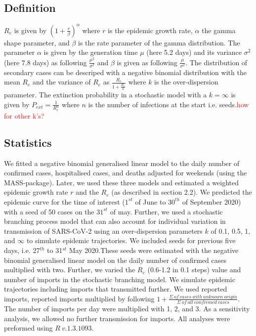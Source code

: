 \documentclass[10pt, a4paper, twoside]{article}
\begin{document}
\begin{multicols}{2}
\subsection{Definition}
$R_e$ is given by $(1 + \frac{r}{\beta} )^\alpha$ where $r$ is the epidemic growth rate, $\alpha$ the gamma shape parameter, and $\beta$ is the rate parameter of the gamma distribution. The parameter $\alpha$ is given by the generation time $\mu$ (here 5.2 days) and its variance $\sigma^2$ (here 7.8 days) as following $\frac{\mu^2}{\sigma^2 }$ and $\beta$ is given as following $\frac{\mu}{\sigma^2}$. The distribution of secondary cases can be descriped with a negative binomial distribution with the mean $R_e$ and the variance of $R_e$ as $\frac{R_e}{1+\frac{R_e}{k}}$ where $k$ is the over-dispersion parameter. The extinction probability in a stochastic model with a $k = \infty$ is given by $ P_{ext} = \frac{1}{R_e^n}$ where $n$ is the number of infections at the start i.e. seeds.\textcolor{red}{how for other k's?}

\subsection{Statistics}
We fitted a negative binomial generalised linear model to the daily number of confirmed cases, hospitalised cases, and deaths adjusted for weekends (using the MASS-package).\cite{venables_modern_2002} Later, we used these three models and estimated a weighted epidemic growth rate $r$ and the $R_e$ (as described in section 2.2). We predicted the epidemic curve for the time of interest ($1^{st}$ of June to $30^{th}$ of September 2020) with a seed of 50 cases on the $31^{st}$ of may. Further, we used a stochastic branching process model that can also account for individual variation in transmission of SARS-CoV-2 using an over-dispersion parameters $k$ of 0.1, 0.5, 1, and  $\infty$ to simulate epidemic trajectories. We included seeds for previous five days, i.e. 27$^{th}$  to 31$^{st}$ May 2020.These seeds were estimated with the negative binomial generalised linear model on the daily number of confirmed cases multiplied with two. Further, we varied the $R_e$ (0.6-1.2 in 0.1 steps) value and number of imports in the stochastic branching model. We simulate epidemic trajectories including imports that transmitted further. We used reported imports, reported imports multiplied by following $1+ \frac{\Sigma ~of ~cases ~with ~unknown ~origin }{\Sigma ~of ~all ~confirmed ~cases}$. The number of imports per day were multiplied with 1, 2, and 3. As a sensitivity analysis, we allowed no further transmission for imports. All analyses were preformed using $R ~v.1.3.1093$.\cite{r_core_team_r_2020}



\end{multicols}
\end{document}
